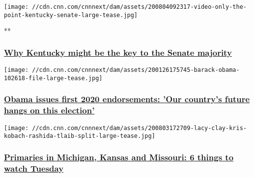 \href{/videos/politics/2020/08/04/amy-mcgrath-mitch-mcconell-kentucky-senate-cillizza-the-point.cnn}{}

\texttt{[image: //cdn.cnn.com/cnnnext/dam/assets/200804092317-video-only-the-point-kentucky-senate-large-tease.jpg]}

**

\hypertarget{why-kentucky-might-be-the-key-to-the-senate-majority}{%
\subsubsection{\texorpdfstring{\href{/videos/politics/2020/08/04/amy-mcgrath-mitch-mcconell-kentucky-senate-cillizza-the-point.cnn}{Why
Kentucky might be the key to the Senate
majority}}{Why Kentucky might be the key to the Senate majority}}\label{why-kentucky-might-be-the-key-to-the-senate-majority}}

\href{/2020/08/03/politics/barack-obama-first-2020-endorsements/index.html}{}

\texttt{[image: //cdn.cnn.com/cnnnext/dam/assets/200126175745-barack-obama-102618-file-large-tease.jpg]}

\hypertarget{obama-issues-first-2020-endorsements-our-countrys-future-hangs-on-this-election}{%
\subsubsection{\texorpdfstring{\href{/2020/08/03/politics/barack-obama-first-2020-endorsements/index.html}{Obama
issues first 2020 endorsements: 'Our country's future hangs on this
election'}}{Obama issues first 2020 endorsements: 'Our country's future hangs on this election'}}\label{obama-issues-first-2020-endorsements-our-countrys-future-hangs-on-this-election}}

\href{/2020/08/04/politics/primary-elections-michigan-kansas-missouri/index.html}{}

\texttt{[image: //cdn.cnn.com/cnnnext/dam/assets/200803172709-lacy-clay-kris-kobach-rashida-tlaib-split-large-tease.jpg]}

\hypertarget{primaries-in-michigan-kansas-and-missouri-6-things-to-watch-tuesday}{%
\subsubsection{\texorpdfstring{\href{/2020/08/04/politics/primary-elections-michigan-kansas-missouri/index.html}{Primaries
in Michigan, Kansas and Missouri: 6 things to watch
Tuesday}}{Primaries in Michigan, Kansas and Missouri: 6 things to watch Tuesday}}\label{primaries-in-michigan-kansas-and-missouri-6-things-to-watch-tuesday}}

